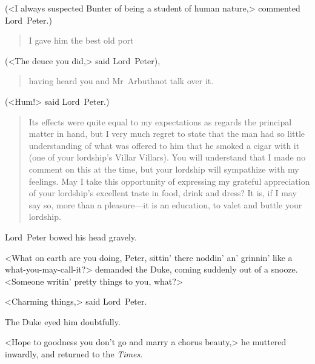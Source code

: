 (<I always suspected Bunter of being a student of human nature,> commented Lord~Peter.)

\begin{quotation}
I gave him the best old port 
\end{quotation}

(<The deuce you did,> said Lord~Peter), 

\begin{quotation}
having heard you and Mr~Arbuthnot talk over it.
\end{quotation}

 (<Hum!> said Lord~Peter.)

\begin{quotation}
Its effects were quite equal to my expectations as regards the principal matter in hand, but I very much regret to state that the man had so little understanding of what was offered to him that he smoked a cigar with it (one of your lordship's Villar Villars). You will understand that I made no comment on this at the time, but your lordship will sympathize with my feelings. May I take this opportunity of expressing my grateful appreciation of your lordship's excellent taste in food, drink and dress? It is, if I may say so, more than a pleasure—it is an education, to valet and buttle your lordship.
\end{quotation}

Lord~Peter bowed his head gravely.

<What on earth are you doing, Peter, sittin' there noddin' an' grinnin' like a what-you-may-call-it?> demanded the Duke, coming suddenly out of a snooze. <Someone writin' pretty things to you, what?>

<Charming things,> said Lord~Peter.

The Duke eyed him doubtfully.

<Hope to goodness you don't go and marry a chorus beauty,> he muttered inwardly, and returned to the \textit{Times}.

